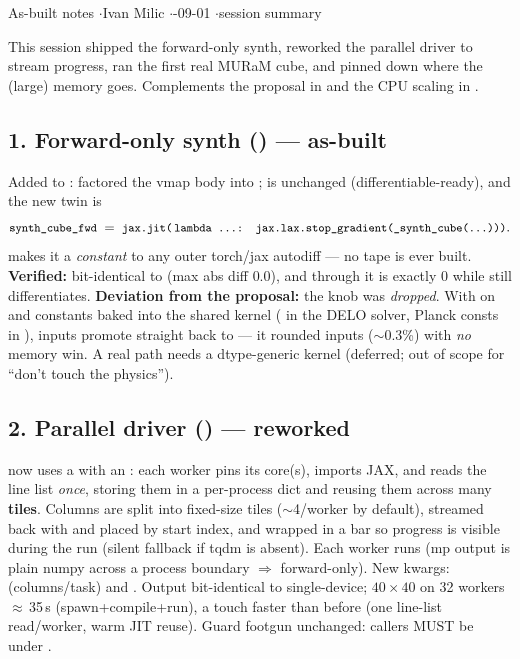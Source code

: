 


%
{As-built notes \quad$\cdot$\quad Ivan Milic \quad$\cdot$-09-01 \quad$\cdot$\quad session summary}

This session shipped the forward-only synth, reworked the parallel driver to stream progress, ran the
first real MURaM cube, and pinned down where the (large) memory goes. Complements the proposal in
 and the CPU scaling in .

\subsection*{1. Forward-only synth () --- as-built}
Added to : factored the vmap body into ;  is
unchanged (differentiable-ready), and the new twin is
\[
\texttt{\small synth\_cube\_fwd} \;=\; \texttt{\small jax.jit(\,lambda \dots: jax.lax.stop\_gradient(\_synth\_cube(\dots)))}.
\]
 makes it a \emph{constant} to any outer torch/jax autodiff --- no tape is ever built.
\textbf{Verified:} bit-identical to  (max abs diff $0.0$), and  through it
is exactly $0$ while  still differentiates.
\textbf{Deviation from the proposal:} the  knob was \emph{dropped}. With  on and
 constants baked into the shared kernel ( in the DELO solver, Planck consts in
),  inputs promote straight back to  --- it rounded inputs ($\sim$0.3\%)
with \emph{no} memory win. A real  path needs a dtype-generic kernel (deferred; out of scope for
``don't touch the physics'').

\subsection*{2. Parallel driver () --- reworked}
 now uses a   with an : each worker pins its
core(s), imports JAX, and reads the line list \emph{once}, storing them in a per-process dict and reusing
them across many \textbf{tiles}. Columns are split into fixed-size tiles ($\sim$4/worker by default),
streamed back with  and placed by start index, and wrapped in a  bar so
progress is visible during the run (silent fallback if tqdm is absent). Each worker runs
 (mp output is plain numpy across a process boundary $\Rightarrow$ forward-only). New
kwargs:  (columns/task) and . Output bit-identical to single-device; $40\times40$
on 32 workers $\approx$\,35\,s (spawn+compile+run), a touch faster than before (one line-list read/worker,
warm JIT reuse). Guard footgun unchanged: callers MUST be under .

